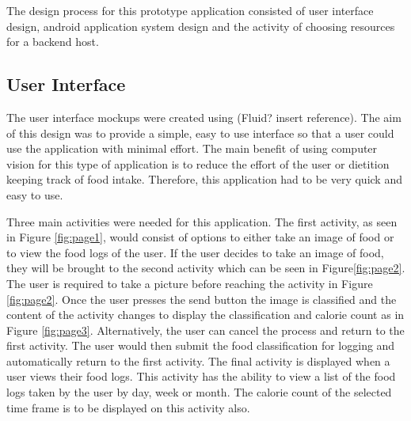 The design process for this prototype application consisted of user interface design, android application system design and the activity of choosing resources for a backend host.

\subsection*{User Interface}
The user interface mockups were created using (Fluid? insert reference).
The aim of this design was to provide a simple, easy to use interface so that a user could use the application with minimal effort.
The main benefit of using computer vision for this type of application is to reduce the effort of the user or dietition keeping track of food intake.
Therefore, this application had to be very quick and easy to use.

Three main activities were needed for this application.
The first activity, as seen in Figure \ref{fig:page1}, would consist of options to either take an image of food or to view the food logs of the user.
If the user decides to take an image of food, they will be brought to the second activity which can be seen in Figure\ref{fig:page2}.
The user is required to take a picture before reaching the activity in Figure \ref{fig:page2}.
Once the user presses the send button the image is classified and the content of the activity changes to display the classification and calorie count as in Figure \ref{fig:page3}.
Alternatively, the user can cancel the process and return to the first activity.
The user would then submit the food classification for logging and automatically return to the first activity.
The final activity is displayed when a user views their food logs.
This activity has the ability to view a list of the food logs taken by the user by day, week or month.
The calorie count of the selected time frame is to be displayed on this activity also.

